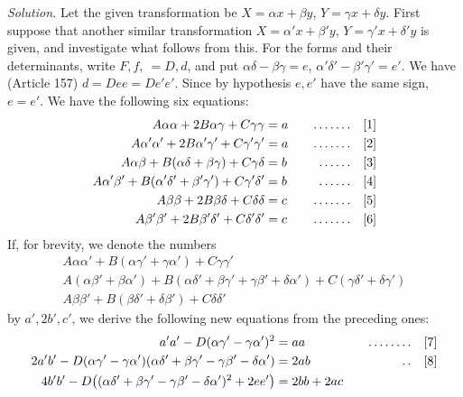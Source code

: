 \textit{Solution.} Let the given transformation be $X=\alpha x+\beta y$, $Y=\gamma x+\delta y$. First suppose that another similar transformation $X=\alpha'x+\beta'y$, $Y=\gamma'x+\delta'y$ is given, and investigate what follows from this. For the forms and their determinants, write $F,f,\ =D,d$, and put $\alpha\delta-\beta\gamma=e$, $\alpha'\delta'-\beta'\gamma'=e'$. We have (Article 157) $d=Dee=De'e'$. Since by hypothesis $e,e'$ have the same sign, $e=e'$. We have the following six equations:
\[
\begin{aligned}
A\alpha\alpha+2B\alpha\gamma+C\gamma\gamma&=a&\quad\mathinner{.\,.\,.\,.\,.\,.\,.}\quad&[1]\\
A\alpha'\alpha'+2B\alpha'\gamma'+C\gamma'\gamma'&=a&\quad\mathinner{.\,.\,.\,.\,.\,.\,.}\quad&[2]\\
A\alpha\beta+B(\alpha\delta+\beta\gamma)+C\gamma\delta&=b&\quad\mathinner{.\,.\,.\,.\,.\,.}\quad&[3]\\
A\alpha'\beta'+B(\alpha'\delta'+\beta'\gamma')+C\gamma'\delta'&=b&\quad\mathinner{.\,.\,.\,.\,.\,.}\quad&[4]\\
A\beta\beta+2B\beta\delta+C\delta\delta&=c&\quad\mathinner{.\,.\,.\,.\,.\,.\,.}\quad&[5]\\
A\beta'\beta'+2B\beta'\delta'+C\delta'\delta'&=c&\quad\mathinner{.\,.\,.\,.\,.\,.\,.}\quad&[6]
\end{aligned}
\]
If, for brevity, we denote the numbers
\[
\begin{gathered}
A\alpha\alpha'+B(\alpha\gamma'+\gamma\alpha')+C\gamma\gamma'\\
A(\alpha\beta'+\beta\alpha')+B(\alpha\delta'+\beta\gamma'+\gamma\beta'+\delta\alpha')+C(\gamma\delta'+\delta\gamma')\\
A\beta\beta'+B(\beta\delta'+\delta\beta')+C\delta\delta'
\end{gathered}
\]
by $a',2b',c'$, we derive the following new equations from the preceding ones:
\[
\begin{aligned}
a'a'-D(\alpha\gamma'-\gamma\alpha')^2&=aa&\quad\mathinner{.\,.\,.\,.\,.\,.\,.\,.}\quad&[7]\\
2a'b'-D(\alpha\gamma'-\gamma\alpha')(\alpha\delta'+\beta\gamma'-\gamma\beta'-\delta\alpha')&=2ab&\quad\mathinner{.\,.}\quad&[8]\\
4b'b'-D\bigl((\alpha\delta'+\beta\gamma'-\gamma\beta'-\delta\alpha')^2+2ee'\bigr)&=2bb+2ac
\end{aligned}
\]
